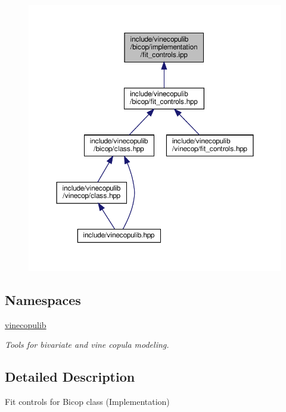 \begin{figure}[H]
\begin{center}
\leavevmode
\includegraphics[width=350pt]{bicop_2implementation_2fit__controls_8ipp__dep__incl}
\end{center}
\end{figure}
\subsection*{Namespaces}
\begin{DoxyCompactItemize}
\item 
 \hyperlink{namespacevinecopulib}{vinecopulib}
\begin{DoxyCompactList}\small\item\em Tools for bivariate and vine copula modeling. \end{DoxyCompactList}\end{DoxyCompactItemize}


\subsection{Detailed Description}
Fit controls for Bicop class (Implementation) 


